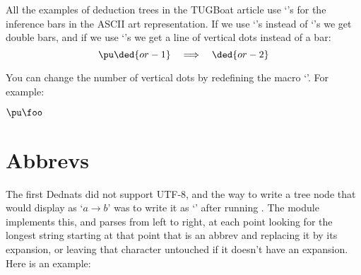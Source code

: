 \documentclass[oneside]{article}
\begin{document}
All the examples of deduction trees in the TUGBoat article use
`\co{-}'s for the inference bars in the ASCII art representation. If
we use `\co{=}'s instead of `\co{-}'s we get double bars, and if we
use `\co{:}'s we get a line of vertical dots instead of a bar:
$$\pu \ded{or-1} \quad\Longrightarrow\quad \ded{or-2}$$

You can change the number of vertical dots by redefining the macro
`\co{\\DeduceSym}'. For example:

\msk

%
%
$\pu\foo$





%

\section{Abbrevs}

The first Dednats did not support UTF-8, and the way to write a tree
node that would display as `$a→b$' was to write it as `'
after running . The module
 implements this, and  parses
 from left to right, at each point looking for the longest
string starting at that point that is an abbrev and replacing it by
its expansion, or leaving that character untouched if it doesn't have
an expansion. Here is an example:

\end{document}
